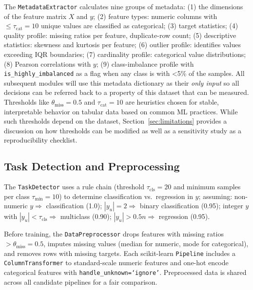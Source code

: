 \documentclass[runningheads]{llncs}
\begin{document}
 The \texttt{MetadataExtractor} calculates nine groups of metadata: (1) the dimensions of the feature matrix $X$ and $y$; (2) feature types: numeric columns with $\leq \tau_{\text{cat}}=10$ unique values are classified as categorical; (3) target statistics; (4) quality profile: missing ratios per feature, duplicate-row count; (5) descriptive statistics: skewness and kurtosis per feature; (6) outlier profile: identifies values exceeding IQR boundaries; (7) cardinality profile: categorical value distributions; (8) Pearson correlations with $y$; (9) class-imbalance profile with \texttt{is\_highly\_imbalanced} as a flag when any class is with \textless{}5\% of the samples. All subsequent modules will use this metadata dictionary as their \emph{only input} so all decisions can be referred back to a property of this dataset that can be measured. Thresholds like $\theta_{\text{miss}} = 0.5$ and $\tau_{\text{cat}} = 10$ are heuristics chosen for stable, interpretable behavior on tabular data based on common ML practices. While such thresholds depend on the dataset, Section~\ref{sec:limitations} provides a discussion on how thresholds can be modified as well as a sensitivity study as a reproducibility checklist.

\subsection{Task Detection and Preprocessing}

The \texttt{TaskDetector} uses a rule chain (threshold $\tau_\text{cls}=20$ and minimum samples per class $\tau_\text{min}=10$) to determine classification vs.\ regression in $y$; assuming: non-numeric $y \Rightarrow$ classification (1.0); $|y_u|=2 \Rightarrow$ binary classification (0.95); integer $y$ with $|y_u|<\tau_\text{cls} \Rightarrow$ multiclass (0.90); $|y_u|>0.5n \Rightarrow$ regression (0.95).

Before training, the \texttt{DataPreprocessor} drops features with missing ratios ${>}\theta_{\text{miss}}=0.5$, imputes missing values (median for numeric, mode for categorical), and removes rows with missing targets. Each scikit-learn \texttt{Pipeline} includes a \texttt{ColumnTransformer} to standard-scale numeric features and one-hot encode categorical features with \texttt{handle\_unknown=`ignore'}. Preprocessed data is shared across all candidate pipelines for a fair comparison.
\end{document}
